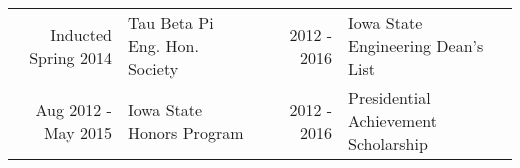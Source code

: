 \documentclass[a4paper,10pt]{article}
\begin{document}
\begin{tabular*}{\textwidth}{r | l c r | l}

  Inducted Spring 2014 & Tau Beta Pi Eng. Hon. Society                     & & %
           2012 - 2016 & Iowa State Engineering Dean's List                                       \\
   Aug 2012 - May 2015 & Iowa State Honors Program                         & & %
           2012 - 2016 & Presidential Achievement Scholarship                                     \\

\end{tabular*}
\end{document}
